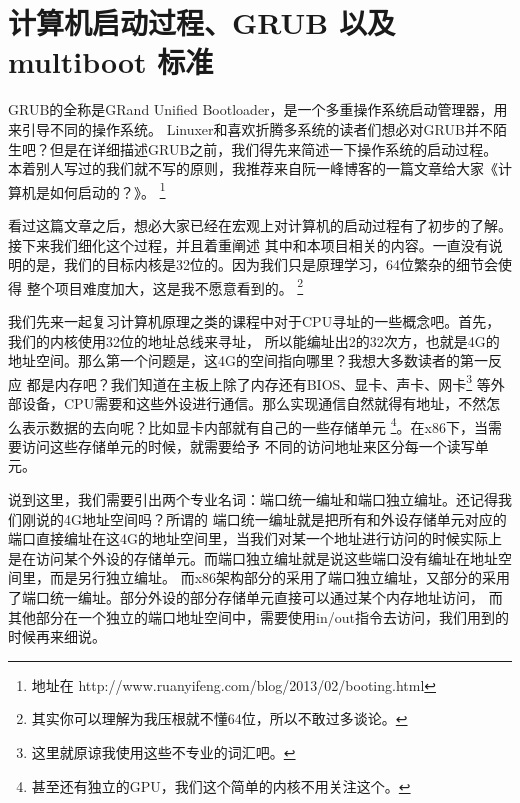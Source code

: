 
\section {计算机启动过程、GRUB 以及 multiboot 标准}

\par GRUB的全称是GRand Unified Bootloader，是一个多重操作系统启动管理器，用来引导不同的操作系统。\allowbreak
Linuxer和喜欢折腾多系统的读者们想必对GRUB并不陌生吧？但是在详细描述GRUB之前，我们得先来简述一下操作系统的启动过程。\allowbreak
本着别人写过的我们就不写的原则，我推荐来自阮一峰博客的一篇文章给大家《计算机是如何启动的？》。
\footnote{地址在 http://www.ruanyifeng.com/blog/2013/02/booting.html}

\par 看过这篇文章之后，想必大家已经在宏观上对计算机的启动过程有了初步的了解。接下来我们细化这个过程，并且着重阐述\allowbreak
其中和本项目相关的内容。一直没有说明的是，我们的目标内核是32位的。因为我们只是原理学习，64位繁杂的细节会使得\allowbreak
整个项目难度加大，这是我不愿意看到的。
\footnote{其实你可以理解为我压根就不懂64位，所以不敢过多谈论。}

\par 我们先来一起复习计算机原理之类的课程中对于CPU寻址的一些概念吧。首先，我们的内核使用32位的地址总线来寻址，\allowbreak
所以能编址出2的32次方，也就是4G的地址空间。那么第一个问题是，这4G的空间指向哪里？我想大多数读者的第一反应\allowbreak
都是内存吧？我们知道在主板上除了内存还有BIOS、显卡、声卡、网卡\footnote{这里就原谅我使用这些不专业的词汇吧。}\allowbreak
等外部设备，CPU需要和这些外设进行通信。那么实现通信自然就得有地址，不然怎么表示数据的去向呢？比如显卡内部就有自己的一些存储单元\allowbreak
\footnote{甚至还有独立的GPU，我们这个简单的内核不用关注这个。}。在x86下，当需要访问这些存储单元的时候，就需要给予\allowbreak
不同的访问地址来区分每一个读写单元。

\par 说到这里，我们需要引出两个专业名词：端口统一编址和端口独立编址。还记得我们刚说的4G地址空间吗？所谓的\allowbreak
端口统一编址就是把所有和外设存储单元对应的端口直接编址在这4G的地址空间里，当我们对某一个地址进行访问的时候实际上\allowbreak
是在访问某个外设的存储单元。而端口独立编址就是说这些端口没有编址在地址空间里，而是另行独立编址。\allowbreak
而x86架构部分的采用了端口独立编址，又部分的采用了端口统一编址。部分外设的部分存储单元直接可以通过某个内存地址访问，\allowbreak
而其他部分在一个独立的端口地址空间中，需要使用in/out指令去访问，我们用到的时候再来细说。

